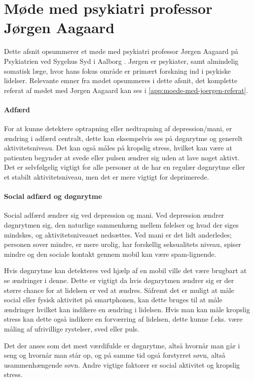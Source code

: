 \section{Møde med psykiatri professor Jørgen Aagaard}\label{sec:moede-med-joergen}
Dette afsnit opsummerer et møde med psykiatri professor Jørgen Aagaard på Psykiatrien ved Sygehus Syd i Aalborg \citep{misc:jorgen-aagaard}. 
Jørgen er psykiater, samt almindelig somatisk læge, hvor hans fokus område er primært forskning ind i psykiske lidelser.
Relevante emner fra mødet opsummeres i dette afsnit, det komplette referat af mødet med Jørgen Aagaard kan ses i \cref{app:moede-med-joergen-referat}.

\paragraph{Adfærd}
For at kunne detektere optrapning eller nedtrapning af depression/mani, er ændring i adfærd centralt, dette kan eksempelvis ses på døgnrytme og generelt aktivitetsniveau. 
Det kan også måles på kropslig stress, hvilket kan være at patienten begynder at svede eller pulsen ændrer sig uden at lave noget aktivt. 
Det er selvfølgelig vigtigt for alle personer at de har en regulær døgnrytme eller et stabilt aktivitetsniveau, men det er mere vigtigt for deprimerede.

\paragraph{Social adfærd og døgnrytme}
Social adfærd ændrer sig ved depression og mani.
Ved depression ændrer døgnrytmen sig, den naturlige sammenhæng mellem følelser og hvad der siges mindskes, og aktivitetsniveauet nedsættes.
Ved mani er det lidt anderledes; personen sover mindre, er mere urolig, har forskellig seksualitets niveau, spiser mindre og den sociale kontakt gennem mobil kan være spam-lignende. 

Hvis døgnrytme kan detekteres ved hjælp af en mobil ville det være brugbart at se ændringer i denne.
Dette er vigtigt da hvis døgnrytmen ændrer sig er der større chance for at lidelsen er ved at ændres.
Såfremt det er muligt at måle social eller fysisk aktivitet på smartphonen, kan dette bruges til at måle ændringer hvilket kan indikere en ændring i lidelsen.
Hvis man kan måle kropslig stress kan dette også indikere en forværring af lidelsen, dette kunne f.eks. være måling af ufrivillige rystelser, sved eller puls. 

Det der anses som det mest værdifulde er døgnrytme, altså hvornår man går i seng og hvornår man står op, og på samme tid også forstyrret søvn, altså usammenhængende søvn. 
Andre vigtige faktorer er social aktivitet og kropslig stress.

